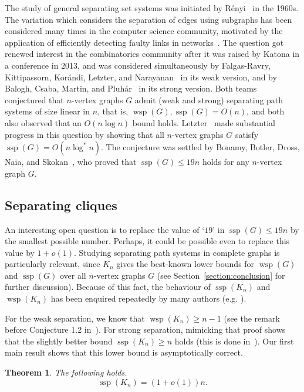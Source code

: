 \documentclass[a4paper, 11pt,reqno]{amsart}
\theoremstyle{plain}
\newtheorem{theorem}{Theorem}[section]
\theoremstyle{definition}
\numberwithin{equation}{section}
\DeclareMathOperator{\wsp}{wsp}
\DeclareMathOperator{\ssp}{ssp}
\begin{document}
The study of general separating set systems was initiated by
Rényi~\cite{Renyi1961} in the 1960s.  The variation which considers the separation
of edges using subgraphs has been considered many times in the computer
science community, motivated by the application of efficiently
detecting faulty links in
networks~\cite{HPWYC2007,HonkalaKarpovskyLitsyn2003,TapolcaiRonyaiHo2013,ZakrevskiKarpovsky1998}.
The question got renewed interest in the combinatorics community after
it was raised by Katona in a conference in 2013, and was considered
simultaneously by Falgas-Ravry, Kittipassorn, Korándi, Letzter, and
Narayanan~\cite{FKKLN2014} in its weak version, and by Balogh, Csaba,
Martin, and Pluhár~\cite{BCMP2016} in its strong version.  Both teams
conjectured that $n$-vertex graphs $G$ admit (weak and strong)
separating path systems of size linear in $n$, that is, $\wsp(G),
\ssp(G) = O(n)$, and both also observed that an $O(n \log n)$ bound
holds. 
Letzter~\cite{Letzter2022} made substantial progress in this question by showing that all $n$-vertex graphs $G$ satisfy $\ssp(G) = O(n \log^\ast n)$.
The conjecture was settled by Bonamy,
Botler, Dross, Naia, and Skokan~\cite{BBDNS2023}, who proved that
$\ssp(G) \leq 19n$ holds for any $n$-vertex graph $G$.

\subsection{Separating cliques}

An interesting open question is to replace the value of `$19$' in
$\ssp(G)\leq 19n$ by the smallest possible number. Perhaps, it could
be possible even to replace this value by $1 + o(1)$.  Studying
separating path systems in complete graphs is particularly relevant, since
$K_n$ gives the best-known lower bounds for $\wsp(G)$ and
$\ssp(G)$ over all $n$-vertex graphs $G$ (see Section~\ref{section:conclusion} for further discussion). Because of this fact, the
behaviour of $\ssp(K_n)$ and $\wsp(K_n)$ has been enquired repeatedly by
many authors (e.g. \cite[Section 7]{FKKLN2014}).

For the weak separation, we know that $\wsp(K_n) \geq n-1$ (see the
remark before Conjecture 1.2 in~\cite{FKKLN2014}).  For strong
separation, mimicking that proof shows that the slightly better bound
$\ssp(K_n) \geq n$ holds (this is done
in~).  Our first main result shows
that this lower bound is asymptotically correct.
\begin{theorem} \label{theorem:completegraph}
	The following holds.
	\[\ssp(K_n) = (1 + o(1))n.\]
\end{theorem}
\end{document}
